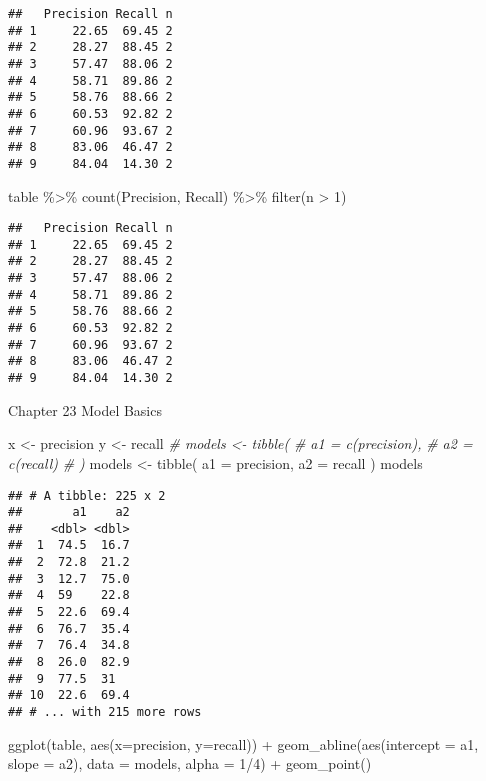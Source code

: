 \documentclass[
]{article}
\newenvironment{Shaded}{\begin{snugshade}}{\end{snugshade}}
\newcommand{\AttributeTok}[1]{\textcolor[rgb]{0.77,0.63,0.00}{#1}}
\newcommand{\CommentTok}[1]{\textcolor[rgb]{0.56,0.35,0.01}{\textit{#1}}}
\newcommand{\DecValTok}[1]{\textcolor[rgb]{0.00,0.00,0.81}{#1}}
\newcommand{\FunctionTok}[1]{\textcolor[rgb]{0.00,0.00,0.00}{#1}}
\newcommand{\NormalTok}[1]{#1}
\newcommand{\OtherTok}[1]{\textcolor[rgb]{0.56,0.35,0.01}{#1}}
\newcommand{\SpecialCharTok}[1]{\textcolor[rgb]{0.00,0.00,0.00}{#1}}
\begin{document}
\begin{verbatim}
##   Precision Recall n
## 1     22.65  69.45 2
## 2     28.27  88.45 2
## 3     57.47  88.06 2
## 4     58.71  89.86 2
## 5     58.76  88.66 2
## 6     60.53  92.82 2
## 7     60.96  93.67 2
## 8     83.06  46.47 2
## 9     84.04  14.30 2
\end{verbatim}

\begin{Shaded}
\begin{Highlighting}[]
\NormalTok{table }\SpecialCharTok{\%\textgreater{}\%} 
  \FunctionTok{count}\NormalTok{(Precision, Recall) }\SpecialCharTok{\%\textgreater{}\%} 
  \FunctionTok{filter}\NormalTok{(n }\SpecialCharTok{\textgreater{}} \DecValTok{1}\NormalTok{)}
\end{Highlighting}
\end{Shaded}

\begin{verbatim}
##   Precision Recall n
## 1     22.65  69.45 2
## 2     28.27  88.45 2
## 3     57.47  88.06 2
## 4     58.71  89.86 2
## 5     58.76  88.66 2
## 6     60.53  92.82 2
## 7     60.96  93.67 2
## 8     83.06  46.47 2
## 9     84.04  14.30 2
\end{verbatim}

Chapter 23 Model Basics

\begin{Shaded}
\begin{Highlighting}[]
\NormalTok{x }\OtherTok{\textless{}{-}}\NormalTok{ precision}
\NormalTok{y }\OtherTok{\textless{}{-}}\NormalTok{ recall}
\CommentTok{\# models \textless{}{-} tibble(}
\CommentTok{\#   a1 = c(precision),}
\CommentTok{\#   a2 = c(recall)}
\CommentTok{\# )}
\NormalTok{models }\OtherTok{\textless{}{-}} \FunctionTok{tibble}\NormalTok{(}
  \AttributeTok{a1 =}\NormalTok{ precision,}
  \AttributeTok{a2 =}\NormalTok{ recall}
\NormalTok{)}
\NormalTok{models}
\end{Highlighting}
\end{Shaded}

\begin{verbatim}
## # A tibble: 225 x 2
##       a1    a2
##    <dbl> <dbl>
##  1  74.5  16.7
##  2  72.8  21.2
##  3  12.7  75.0
##  4  59    22.8
##  5  22.6  69.4
##  6  76.7  35.4
##  7  76.4  34.8
##  8  26.0  82.9
##  9  77.5  31  
## 10  22.6  69.4
## # ... with 215 more rows
\end{verbatim}

\begin{Shaded}
\begin{Highlighting}[]
\FunctionTok{ggplot}\NormalTok{(table, }\FunctionTok{aes}\NormalTok{(}\AttributeTok{x=}\NormalTok{precision, }\AttributeTok{y=}\NormalTok{recall)) }\SpecialCharTok{+} 
  \FunctionTok{geom\_abline}\NormalTok{(}\FunctionTok{aes}\NormalTok{(}\AttributeTok{intercept =}\NormalTok{ a1, }\AttributeTok{slope =}\NormalTok{ a2), }\AttributeTok{data =}\NormalTok{ models, }\AttributeTok{alpha =} \DecValTok{1}\SpecialCharTok{/}\DecValTok{4}\NormalTok{) }\SpecialCharTok{+}
  \FunctionTok{geom\_point}\NormalTok{()}
\end{Highlighting}
\end{Shaded}
\end{document}
